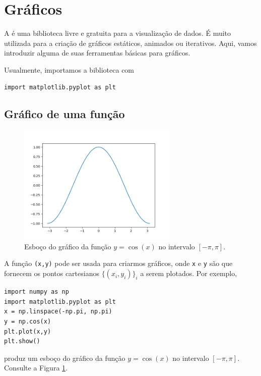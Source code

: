 

\section{Gráficos}\label{sec_graf}

A \hl{\PYTHONmatplotlib} é uma biblioteca {\python} livre e gratuita para a visualização de dados. É muito utilizada para a criação de gráficos estáticos, animados ou iterativos. Aqui, vamos introduzir alguma de suas ferramentas básicas para gráficos.

Usualmente, importamos a biblioteca com

\begin{lstlisting}
import matplotlib.pyplot as plt
\end{lstlisting}

\subsection{Gráfico de uma função}\label{sec_graf_ssec_fun}

\begin{figure}[h]
  \centering
  \includegraphics[width=3in]{sec_grafico/data/sen.png}
  \caption{Esboço do gráfico da função $y=\cos(x)$ no intervalo $[-\pi,\pi]$.}
  \label{fig:sen}
\end{figure}

A função {\PYTHONmatplotlibDOTpyplotDOTplot}\texttt{(x,y)} pode ser usada para criarmos gráficos, onde \texttt{x} e \texttt{y} são {\PYTHONnumpyDOTarrays} que fornecem os pontos cartesianos $\{(x_i, y_i)\}_{i}$ a serem plotados. Por exemplo,

\begin{lstlisting}
import numpy as np
import matplotlib.pyplot as plt
x = np.linspace(-np.pi, np.pi)
y = np.cos(x)
plt.plot(x,y)
plt.show()
\end{lstlisting}

produz um esboço do gráfico da função $y=\cos(x)$ no intervalo $[-\pi,\pi]$. Consulte a Figura \ref{fig:sen}.


